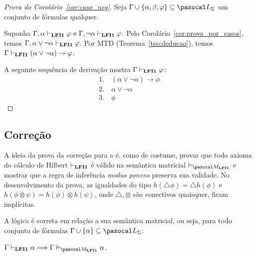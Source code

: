         \begin{proof}[Prova do Corolário~\ref{cor:caso_neg}]
            Seja $\Gamma \cup \{\alpha, \beta, \phi\} \subseteq \ling{}$ um conjunto de fórmulas qualquer.

            Suponha $\Gamma, \alpha \vdash_{{\normalfont\textbf{LFI1}}{}} \varphi \text{ e }\Gamma, \neg\alpha \vdash_{{\normalfont\textbf{LFI1}}{}} \varphi$. Pelo Corolário~\ref{cor:prova_por_casos}, temos $\Gamma, \alpha \lor \neg \alpha \vdash_{{\normalfont\textbf{LFI1}}{}} \varphi$. Por MTD (Teorema~\ref{teo:deducao}), temos $\Gamma \vdash_{{\normalfont\textbf{LFI1}}{}} (\alpha \lor \neg \alpha) \to \varphi$.

            A seguinte sequência de derivação mostra $\Gamma\vdash_{{\normalfont\textbf{LFI1}}{}} \varphi$:
            \begin{align*}
                1. ~& (\alpha \lor \neg \alpha) \to \phi\tag{MTD aplicado à suposição} \\
                2. ~& \alpha \lor \neg \alpha \tag{Ax10} \\
                3. ~& \phi \tag{MP 1,2}
            \end{align*}
        \end{proof}
    \subsection{Correção}\label{sec:cor}
        A ideia da prova da correção para a \lfium{} é, como de costume, provar que todo axioma do cálculo de Hilbert $\vdash_{{\normalfont\textbf{LFI1}}{}}$ é válido na semântica matricial $\conmat$ e mostrar que a regra de inferência \textit{modus ponens} preserva sua validade. No desenvolvimento da prova, as igualdades do tipo $h(\triangle \phi) = \triangle h(\phi)$ e $h(\phi \otimes \psi) = h(\phi) \otimes h(\psi)$, onde $\triangle, \otimes$ são conectivos quaisquer, ficam implícitas.


        \begin{teorema}\label{teo:correcao_mat}
            A lógica {\normalfont\lfium{}} é correta em relação a sua semântica matricial, ou seja, para todo conjunto de fórmulas $\Gamma \cup \{\alpha\} \subseteq \ling{}$:

            \centering
            {\normalfont{} $\Gamma \conhil \alpha \Longrightarrow \Gamma \conmat \alpha$.}
        \end{teorema}


